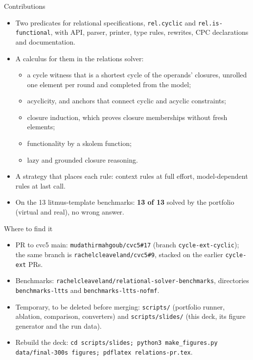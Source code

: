 \documentclass[aspectratio=169]{beamer}
\newcommand{\sm}[1]{\texttt{#1}}
\begin{document}
\begin{frame}{Contributions}
  \begin{itemize}
    \item Two predicates for relational specifications, \sm{rel.cyclic} and
      \sm{rel.is-functional}, with API, parser, printer, type rules, rewrites, CPC declarations and
      documentation.
    \item A calculus for them in the relations solver:
      \begin{itemize}
        \item a cycle witness that is a shortest cycle of the operands' closures, unrolled
          one element per round and completed from the model;
        \item acyclicity, and anchors that connect cyclic and acyclic constraints;
        \item closure induction, which proves closure memberships without fresh elements;
        \item functionality by a skolem function;
        \item lazy and grounded closure reasoning.
      \end{itemize}
    \item A strategy that places each rule: context rules at full effort, model-dependent rules
      at last call.
    \item On the 13 litmus-template benchmarks: \textbf{13 of 13} solved by the portfolio
      (virtual and real), no wrong answer.
  \end{itemize}
\end{frame}

\begin{frame}{Where to find it}
  \small
  \begin{itemize}
    \item PR to cvc5 main: \sm{mudathirmahgoub/cvc5\#17} (branch \sm{cycle-ext-cyclic}); the same
      branch is \sm{rachelcleaveland/cvc5\#9}, stacked on the earlier \sm{cycle-ext} PRs.
    \item Benchmarks: \sm{rachelcleaveland/relational-solver-benchmarks}, directories
      \sm{benchmarks-ltts} and \sm{benchmarks-ltts-nofmf}.
    \item Temporary, to be deleted before merging: \sm{scripts/} (portfolio runner, ablation,
      comparison, converters) and \sm{scripts/slides/} (this deck, its figure generator and the
      run data).
    \item Rebuild the deck: \sm{cd scripts/slides; python3 make\_figures.py data/final-300s
      figures; pdflatex relations-pr.tex}.
  \end{itemize}
\end{frame}
\end{document}
